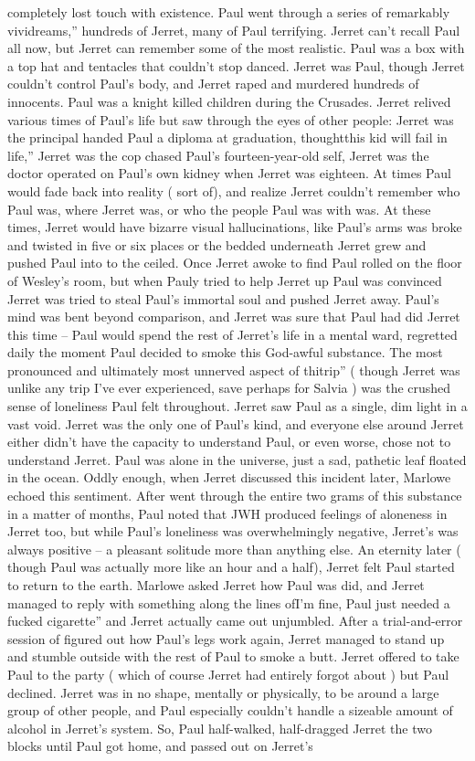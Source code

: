 \documentclass[12pt]{book}
\begin{document}
completely lost touch with existence. Paul went through a series of remarkably vividreams,'' hundreds of Jerret, many of Paul terrifying. Jerret can't recall Paul all now, but Jerret can remember some of the most realistic. Paul was a box with a top hat and tentacles that couldn't stop danced. Jerret was Paul, though Jerret couldn't control Paul's body, and Jerret raped and murdered hundreds of innocents. Paul was a knight killed children during the Crusades. Jerret relived various times of Paul's life but saw through the eyes of other people: Jerret was the principal handed Paul a diploma at graduation, thoughtthis kid will fail in life,'' Jerret was the cop chased Paul's fourteen-year-old self, Jerret was the doctor operated on Paul's own kidney when Jerret was eighteen. At times Paul would fade back into reality ( sort of), and realize Jerret couldn't remember who Paul was, where Jerret was, or who the people Paul was with was. At these times, Jerret would have bizarre visual hallucinations, like Paul's arms was broke and twisted in five or six places or the bedded underneath Jerret grew and pushed Paul into to the ceiled. Once Jerret awoke to find Paul rolled on the floor of Wesley's room, but when Pauly tried to help Jerret up Paul was convinced Jerret was tried to steal Paul's immortal soul and pushed Jerret away. Paul's mind was bent beyond comparison, and Jerret was sure that Paul had did Jerret this time -- Paul would spend the rest of Jerret's life in a mental ward, regretted daily the moment Paul decided to smoke this God-awful substance. The most pronounced and ultimately most unnerved aspect of thitrip'' ( though Jerret was unlike any trip I've ever experienced, save perhaps for Salvia ) was the crushed sense of loneliness Paul felt throughout. Jerret saw Paul as a single, dim light in a vast void. Jerret was the only one of Paul's kind, and everyone else around Jerret either didn't have the capacity to understand Paul, or even worse, chose not to understand Jerret. Paul was alone in the universe, just a sad, pathetic leaf floated in the ocean. Oddly enough, when Jerret discussed this incident later, Marlowe echoed this sentiment. After went through the entire two grams of this substance in a matter of months, Paul noted that JWH produced feelings of aloneness in Jerret too, but while Paul's loneliness was overwhelmingly negative, Jerret's was always positive -- a pleasant solitude more than anything else. An eternity later ( though Paul was actually more like an hour and a half), Jerret felt Paul started to return to the earth. Marlowe asked Jerret how Paul was did, and Jerret managed to reply with something along the lines ofI'm fine, Paul just needed a fucked cigarette'' and Jerret actually came out unjumbled. After a trial-and-error session of figured out how Paul's legs work again, Jerret managed to stand up and stumble outside with the rest of Paul to smoke a butt. Jerret offered to take Paul to the party ( which of course Jerret had entirely forgot about ) but Paul declined. Jerret was in no shape, mentally or physically, to be around a large group of other people, and Paul especially couldn't handle a sizeable amount of alcohol in Jerret's system. So, Paul half-walked, half-dragged Jerret the two blocks until Paul got home, and passed out on Jerret's 
\end{document}
